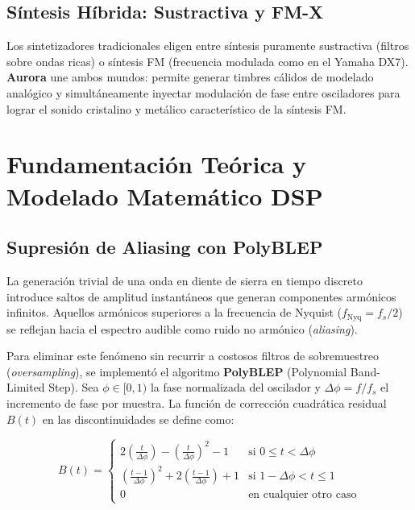 \documentclass[11pt,a4paper]{article}
\begin{document}
\subsection{Síntesis Híbrida: Sustractiva y FM-X}
Los sintetizadores tradicionales eligen entre síntesis puramente sustractiva (filtros sobre ondas ricas) o síntesis FM (frecuencia modulada como en el Yamaha DX7). \textbf{Aurora} une ambos mundos: permite generar timbres cálidos de modelado analógico y simultáneamente inyectar modulación de fase entre osciladores para lograr el sonido cristalino y metálico característico de la síntesis FM.

\section{Fundamentación Teórica y Modelado Matemático DSP}

\subsection{Supresión de Aliasing con PolyBLEP}
La generación trivial de una onda en diente de sierra en tiempo discreto introduce saltos de amplitud instantáneos que generan componentes armónicos infinitos. Aquellos armónicos superiores a la frecuencia de Nyquist ($f_{\text{Nyq}} = f_s / 2$) se reflejan hacia el espectro audible como ruido no armónico (\textit{aliasing}).

Para eliminar este fenómeno sin recurrir a costosos filtros de sobremuestreo (\textit{oversampling}), se implementó el algoritmo \textbf{PolyBLEP} (Polynomial Band-Limited Step). Sea $\phi \in [0, 1)$ la fase normalizada del oscilador y $\Delta\phi = f / f_s$ el incremento de fase por muestra. La función de corrección cuadrática residual $B(t)$ en las discontinuidades se define como:

\begin{equation}
B(t) = \begin{cases} 
2\left(\frac{t}{\Delta\phi}\right) - \left(\frac{t}{\Delta\phi}\right)^2 - 1 & \text{si } 0 \le t < \Delta\phi \\
\left(\frac{t - 1}{\Delta\phi}\right)^2 + 2\left(\frac{t - 1}{\Delta\phi}\right) + 1 & \text{si } 1 - \Delta\phi < t \le 1 \\
0 & \text{en cualquier otro caso}
\end{cases}
\end{equation}
\end{document}
